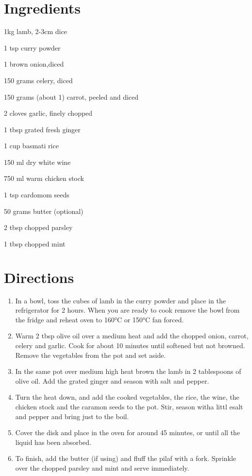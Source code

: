 
\section*{Ingredients}
\bigskip
\begin{ingredients-list}
	\item 1kg lamb, 2-3cm dice
	\item 1 tsp curry powder
	\item 1 brown onion,diced
	\item 150 grams celery, diced
 	\item 150 grams (about 1) carrot, peeled and diced
	\item 2 cloves garlic, finely chopped
	\item 1 tbsp grated fresh ginger
	\item 1 cup basmati rice
	\item 150 ml dry white wine
	\item 750 ml warm chicken stock
	\item 1 tsp cardomom seeds
	\item 50 grams butter (optional)
	\item 2 tbsp chopped parsley
	\item 1 tbsp chopped mint
\end{ingredients-list}

\section*{Directions}
\begin{enumerate}
	\item  In a bowl, toss the cubes of lamb in the curry powder and place in the refrigerator for 2 hours.
		When you are ready to cook remove the bowl from the fridge and reheat oven to 160°C or 150°C fan forced.
	\item Warm 2 tbsp olive oil over a medium heat and add the chopped onion, carrot, celery and garlic.  Cook for about 10 minutes until softened but not browned.
		Remove the vegetables from the pot and set aside.
	\item In the same pot over medium high heat brown the lamb in 2 tablespoons of olive oil. Add the grated ginger and season with salt and pepper.
	\item Turn the heat down, and add the cooked vegetables, the rice, the wine, the chicken stock and the caramon seeds to the  pot. Stir, season witha littl esalt and pepper and bring just to the 					boil.
	\item Cover the disk and place in the oven for around 45 minutes, or until all the liquid has been absorbed.
	\item To finish, add the butter (if using) and fluff the pilaf with a fork. Sprinkle over the chopped parsley and mint and serve immediately.
\end{enumerate}
 


